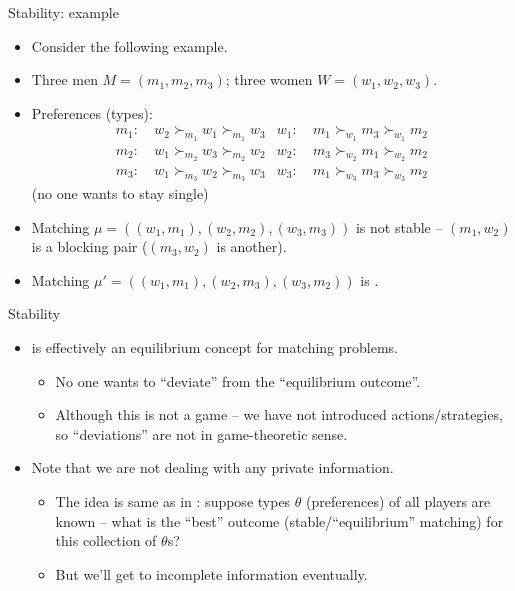 \documentclass[english,10pt
,aspectratio=169
]{beamer}
\begin{document}
\begin{frame}{Stability: example}
\begin{example}
	\begin{itemize}
		\item Consider the following example.
		\item Three men $M = (m_1,m_2,m_3)$; three women $W = (w_1,w_2,w_3)$.
		\item Preferences (types):
		\begin{align*}
			m_1:& \ w_2 \succ_{m_1} w_1 \succ_{m_1} w_3 	& w_1:& \ m_1 \succ_{w_1} m_3 \succ_{w_1} m_2
			\\
			m_2:& \ w_1 \succ_{m_2} w_3 \succ_{m_2} w_2 	& w_2:& \ m_3 \succ_{w_2} m_1 \succ_{w_2} m_2
			\\
			m_3:& \ w_1 \succ_{m_3} w_2 \succ_{m_3} w_3 	& w_3:& \ m_1 \succ_{w_3} m_3 \succ_{w_3} m_2
		\end{align*}
		(no one wants to stay single)
		\item Matching $\mu = \left( (w_1,m_1), (w_2,m_2), (w_3,m_3) \right)$ is \alert{not stable} -- $(m_1,w_2)$ is a blocking pair ($(m_3,w_2)$ is another).
		\item Matching $\mu' = \left( (w_1,m_1), (w_2,m_3), (w_3,m_2) \right)$ is .
	\end{itemize}
\end{example}
\end{frame}


\begin{frame}{Stability}
\begin{itemize}
	\item {} is effectively an equilibrium concept for matching problems.
	\begin{itemize}
		\item No one wants to ``deviate'' from the ``equilibrium outcome''.
		\item Although this is not a game -- we have not introduced actions/strategies, so ``deviations'' are not in game-theoretic sense.
	\end{itemize}
	\item Note that we are \alert{not} dealing with any \alert{private information}.
	\begin{itemize}
		\item The idea is same as in : suppose types $\theta$ (preferences) of all players are known -- what is the ``best'' outcome (stable/``equilibrium'' matching) for this collection of $\theta$s?
		\item But we'll get to incomplete information eventually.
	\end{itemize}
\end{itemize}
\end{frame}
\end{document}
